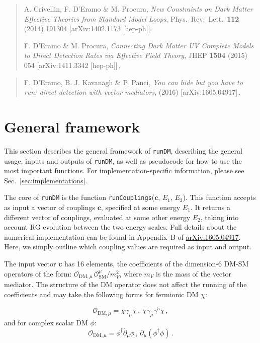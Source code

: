 \documentclass[notitlepage,12pt]{article}
\newcommand{\runDM}{\texttt{runDM}\xspace}
\newcommand{\ourpaper}{\href{http://arxiv.org/abs/1605.04917}{arXiv:1605.04917}\xspace}
\begin{document}
\begin{quote}

 A. Crivellin, F. D'Eramo \& M. Procura, \textit{New Constraints on Dark Matter Effective Theories from Standard Model Loops}, Phys.\ Rev.\ Lett.\  {\bf 112} (2014) 191304 [arXiv:1402.1173 [hep-ph]].

F. D'Eramo \& M. Procura, \textit{Connecting Dark Matter UV Complete Models to Direct Detection Rates via Effective Field Theory}, JHEP {\bf 1504} (2015) 054 [arXiv:1411.3342 [hep-ph]]\,,
\end{quote}

\begin{quote}
F. D'Eramo, B. J. Kavanagh \& P. Panci, \textit{You can hide but you have to run: direct detection with vector mediators}, (2016) [arXiv:1605.04917]\,.
\end{quote}


\section{General framework}

This section describes the general framework of \runDM, describing the general usage, inputs and outputs of \runDM, as well as pseudocode for how to use the most important functions. For implementation-specific information, please see Sec.~\ref{sec:implementations}.

The core of \runDM is the function \texttt{runCouplings}($\mathbf{c}$, $E_1$, $E_2$). This function accepts as input a vector of couplings $\mathbf{c}$, specified at some energy $E_1$. It returns a different vector of couplings, evaluated at some other energy $E_2$, taking into account RG evolution between the two energy scales. Full details about the numerical implementation can be found in Appendix~B of \ourpaper. Here, we simply outline which coupling values are required as input and output.

The input vector  $\mathbf{c}$ has 16 elements, the coefficients of the dimension-6 DM-SM operators of the form: $\mathcal{O}_{\mathrm{DM},\mu} \, \mathcal{O}_\mathrm{SM}^\mu/m_V^2$, where $m_V$ is the mass of the vector mediator. The structure of the DM operator does not affect the running of the coefficients and may take the following forms for fermionic DM $\chi$:

\begin{equation}
\mathcal{O}_{\mathrm{DM},\mu} = \overline{\chi}\gamma_\mu \chi\,, \,\overline{\chi} \gamma_\mu \gamma^5 \chi\,,
\end{equation}
and for complex scalar DM $\phi$:
\begin{equation}
\mathcal{O}_{\mathrm{DM},\mu} = \phi^\dagger \overleftrightarrow{\partial}_\mu \phi\, , \, \partial_\mu (\phi^\dagger \phi)\,.\end{equation}
\end{document}
